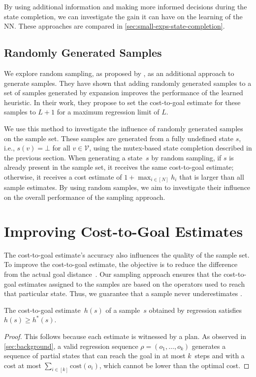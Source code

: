 By using additional information and making more informed decisions during the state completion, we can investigate the gain it can have on the learning of the NN. These approaches are compared in \cref{sec:small-exps-state-completion}.

\subsection{Randomly Generated Samples}
\label{sec:random-samples}

We explore random sampling, as proposed by \citet{otoole2022sampling}, as an additional approach to generate samples. They have shown that adding randomly generated samples to a set of samples generated by expansion improves the performance of the learned heuristic. In their work, they propose to set the cost-to-goal estimate for these samples to $L+1$ for a maximum regression limit of $L$.

We use this method to investigate the influence of randomly generated samples on the sample set. These samples are generated from a fully undefined state $s$, i.e., $s(v) = \bot$ for all $v \in \mathcal{V}$, using the mutex-based state completion described in the previous section. When generating a state~$s$ by random sampling, if $s$ is already present in the sample set, it receives the same cost-to-goal estimate; otherwise, it receives a cost estimate of $1+\max_{i\in[N]} h_i$ that is larger than all sample estimates. By using random samples, we aim to investigate their influence on the overall performance of the sampling approach.

\section{Improving Cost-to-Goal Estimates}
\label{sec:cost-to-goal-estimates}

The cost-to-goal estimate's accuracy also influences the quality of the sample set. To improve the cost-to-goal estimate, the objective is to reduce the difference from the actual goal distance~\hstar. Our sampling approach ensures that the cost-to-goal estimates assigned to the samples are based on the operators used to reach that particular state. Thus, we guarantee that a sample never underestimates \hstar.

\begin{property}
    \label{prop:hvalue}
    The cost-to-goal estimate~$h(s)$ of a sample~$s$ obtained by regression satisfies $h(s)\geq h^*(s)$.
\end{property}
\begin{proof}
    This follows because each estimate is witnessed by a plan. As observed in \cref{sec:background}, a valid regression sequence $\rho=(o_1,\ldots,o_k)$ generates a sequence of partial states that can reach the goal in at most $k$~steps and with a cost at most $\sum_{i\in[k]}\text{cost}(o_i)$, which cannot be lower than the optimal cost.
\end{proof}


